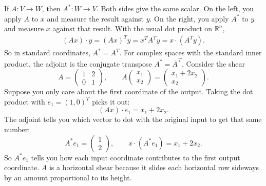 \documentclass{report}
\begin{document}
\begin{itemize}
            If \(A:V\to W\), then \(A^*:W\to V\). Both sides give the same scalar. On the left, you apply \(A\) to \(x\) and measure the result against \(y\). On the right, you apply \(A^*\) to \(y\) and measure \(x\) against that result.
            \bigbreak \noindent 
            With the usual dot product on \(\mathbb R^n\),
            \begin{align*}
                (Ax)\cdot y=(Ax)^T y=x^T A^T y=x\cdot(A^T y)
            .\end{align*}
            So in standard coordinates, \(A^*=A^T\). For complex spaces with the standard inner product, the adjoint is the conjugate transpose \(A^*=\overline{A}^{\,T}\).
            \bigbreak \noindent 
            Consider the shear
            \[
                A=\begin{pmatrix}1&2\\0&1\end{pmatrix},
                \qquad
                A\begin{pmatrix}x_1\\x_2\end{pmatrix}
                =\begin{pmatrix}x_1+2x_2\\x_2\end{pmatrix}.
            \]
            Suppose you only care about the first coordinate of the output. Taking the dot product with \(e_1=(1,0)^T\) picks it out:
            \[
                (Ax)\cdot e_1=x_1+2x_2.
            \]
            The adjoint tells you which vector to dot with the original input to get that same number:
            \[
                A^*e_1=\begin{pmatrix}1\\2\end{pmatrix},
                \qquad
                x\cdot(A^*e_1)=x_1+2x_2.
            \]
            So \(A^*e_1\) tells you how each input coordinate contributes to the first output coordinate. \(A\) is a horizontal shear because it slides each horizontal row sideways by an amount proportional to its height.

        
    \end{itemize}
\end{document}
